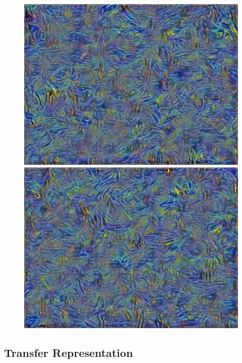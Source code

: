 \documentclass{article}
\begin{document}
\begin{figure}
    \begin{minipage}{0.3\linewidth}
    \includegraphics[width=\textwidth]{img/style/block4_conv1}
    \end{minipage}
    \begin{minipage}{0.3\linewidth}
    \includegraphics[width=\textwidth]{img/style/block5_conv1}
    \end{minipage}

\end{figure}



\subsection{Transfer Representation}
\end{document}
